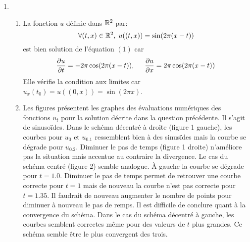 \begin{enumerate}
 \item
 \begin{enumerate}
  \item La fonction $u$ définie dans $\mathbb{R}^2$ par:
\[
 \forall (t,x)\in \mathbb{R}^2, \; u((t,x)) = \sin(2\pi(x - t))
\]
est bien solution de l'équation $(1)$ car
\[
 \frac{\partial u}{\partial t} = -2\pi \cos(2\pi(x-t)), \hspace{0.5cm} \frac{\partial u}{\partial x} = 2\pi \cos(2\pi(x-t))
\]
Elle vérifie la condition aux limites car $u_x(t_0) = u((0,x)) = \sin(2\pi x)$.

  \item Les figures présentent les graphes des évaluations numériques des fonctions $u_t$ pour la solution décrite dans la question précédente. Il s'agit de sinusoïdes.\newline
  Dans le schéma décentré à droite (figure 1 gauche), les courbes pour $u_0$ et $u_{0.1}$ ressemblent bien à des sinusïdes mais la courbe se dégrade pour $u_{0.2}$. Diminuer le pas de temps (figure 1 droite) n'améliore pas la situation mais accentue au contraire la divergence. 
  Le cas du schéma centré (figure 2) semble analogue. \`A gauche la courbe se dégrade pour $t=1.0$. Diminuer le pas de temps permet de retrouver une courbe correcte pour $t=1$ mais de nouveau la courbe n'est pas correcte pour $t=1.35$. Il faudrait de nouveau augmenter le nombre de points pour diminuer à nouveau le pas de remps. Il est difficile de conclure quant à la convergence du schéma.\newline
  Dans le cas du schéma décentré à gauche, les courbes semblent correctes même pour des valeurs de $t$ plus grandes. Ce schéma semble être le plus convergent des trois.
 \end{enumerate}


\end{enumerate}
